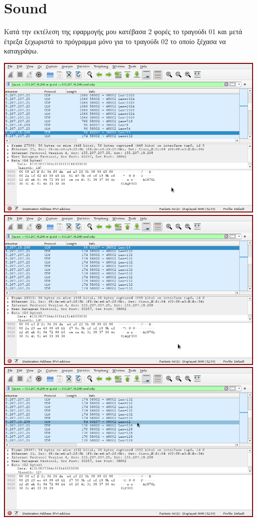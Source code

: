 \documentclass{article}
\begin{document}
\newpage
\section{Sound}

Κατά την εκτέλεση της εφαρμογής μου κατέβασα 2 φορές το τραγούδι 01
και μετά έτρεξα ξεχωριστά το πρόγραμμα μόνο για το τραγούδι 02 το οποίο
ξέχασα να καταγράψω.

\includegraphics[width=\textwidth]{wireshark9.png}
\includegraphics[width=\textwidth]{wireshark10.png}
\includegraphics[width=\textwidth]{wireshark11.png}
\end{document}
